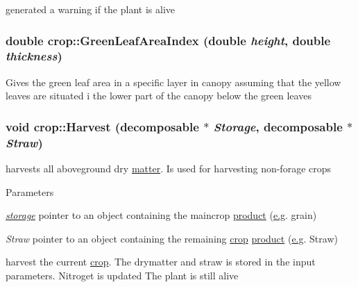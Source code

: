 \label{classcrop_a4acf198494d9c34cf42f27e5a9f11032}
generated a warning if the plant is alive \hypertarget{classcrop_a5c3e9f999f957f7bebe6cca43f569eab}{
\subsubsection[{GreenLeafAreaIndex}]{\setlength{\rightskip}{0pt plus 5cm}double crop::GreenLeafAreaIndex (double {\em height}, \/  double {\em thickness})}}
\label{classcrop_a5c3e9f999f957f7bebe6cca43f569eab}
Gives the green leaf area in a specific layer in canopy assuming that the yellow leaves are situated i the lower part of the canopy below the green leaves \hypertarget{classcrop_a387dc393ee7cd05a40874739cff8579e}{
\subsubsection[{Harvest}]{\setlength{\rightskip}{0pt plus 5cm}void crop::Harvest ({\bf decomposable} $\ast$ {\em Storage}, \/  {\bf decomposable} $\ast$ {\em Straw})}}
\label{classcrop_a387dc393ee7cd05a40874739cff8579e}


harvests all aboveground dry \hyperlink{classmatter}{matter}. Is used for harvesting non-\/forage crops 
\begin{DoxyParams}{Parameters}
\item[{\em \hyperlink{classstorage}{storage}}]pointer to an object containing the maincrop \hyperlink{classproduct}{product} (\hyperlink{typer_8h_ae4c405e5c68c6ec2c44bb6d6adfc2f6ca35c0bb7088830963c73dcf0470ab8922}{e.g}. grain) \item[{\em Straw}]pointer to an object containing the remaining \hyperlink{classcrop}{crop} \hyperlink{classproduct}{product} (\hyperlink{typer_8h_ae4c405e5c68c6ec2c44bb6d6adfc2f6ca35c0bb7088830963c73dcf0470ab8922}{e.g}. Straw)\end{DoxyParams}
harvest the current \hyperlink{classcrop}{crop}. The drymatter and straw is stored in the input parameters. Nitroget is updated The plant is still alive 

